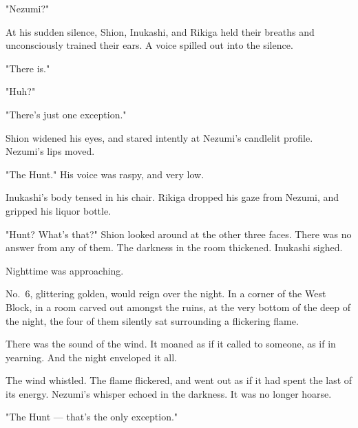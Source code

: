 "Nezumi?"

At his sudden silence, Shion, Inukashi, and Rikiga held their breaths
and unconsciously trained their ears. A voice spilled out into the
silence.

"There is."

"Huh?"

"There's just one exception."

Shion widened his eyes, and stared intently at Nezumi's candlelit
profile. Nezumi's lips moved.

"The Hunt." His voice was raspy, and very low.

Inukashi's body tensed in his chair. Rikiga dropped his gaze from
Nezumi, and gripped his liquor bottle.

"Hunt? What's that?" Shion looked around at the other three faces. There
was no answer from any of them. The darkness in the room thickened.
Inukashi sighed.

Nighttime was approaching.

No.~6, glittering golden, would reign over the night. In a corner of the
West Block, in a room carved out amongst the ruins, at the very bottom
of the deep of the night, the four of them silently sat surrounding a
flickering flame.

There was the sound of the wind. It moaned as if it called to someone,
as if in yearning. And the night enveloped it all.

The wind whistled. The flame flickered, and went out as if it had spent
the last of its energy. Nezumi's whisper echoed in the darkness. It was
no longer hoarse.

"The Hunt --- that's the only exception."